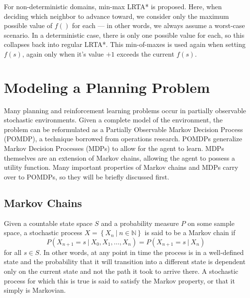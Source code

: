 \documentclass[tog]{acmsiggraph}
\newcommand{\given}[1][]{\:#1\vert\:}
\begin{document}
For non-deterministic domains, min-max LRTA*\cite{koenig2006real} is
proposed. Here, when deciding which neighbor to advance toward, we
consider only the maximum possible value of \(f()\) for each --- in
other words, we always assume a worst-case scenario. In a
deterministic case, there is only one possible value for each, so this
collapses back into regular LRTA*. This min-of-maxes is used again
when setting \(f(s)\), again only when it's value \(+1\) exceeds the
current \(f(s)\).

\section[Modeling a Planning Problem] {Modeling a Planning Problem \footnotemark}


Many planning and reinforcement learning problems occur in partially 
observable stochastic environments. Given a complete model of the 
environment, the problem can be reformulated as a Partially Observable 
Markov Decision Process (POMDP), a technique borrowed from operations 
research. POMDPs generalize Markov Decision Processes (MDPs) to allow 
for the agent to learn. MDPs themselves are an extension of Markov chains, 
allowing the agent to possess a utility function. Many important 
properties of Markov chains and MDPs carry over to POMDPs, so they will 
be briefly discussed first.

\subsection{Markov Chains}

Given a countable state space $S$ and a probability measure $P$ on some 
sample space, a stochastic process $X = \left\{ X_n \given n \in \mathbb{N} \right\}$ 
is said to be a Markov chain if
\begin{equation*}
  P \left( X_{n+1} = s \given X_0, X_1, \ldots, X_n \right) = P \left( X_{n+1} = s \given X_n \right)
\end{equation*}
for all $s \in S$. In other words, at any point in time the process is 
in a well-defined state and the probability that it will transition into 
a different state is dependent only on the current state and not the path 
it took to arrive there. A stochastic process for which this is true is said 
to satisfy the Markov property, or that it simply is Markovian.
\end{document}
